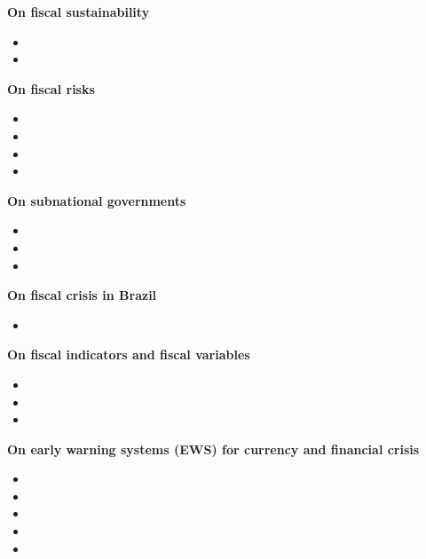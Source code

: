 \documentclass[12pt]{article}
\begin{document}
\textbf{On fiscal sustainability}

\begin{itemize}
\item {}
\item {}
\end{itemize}

\textbf{On fiscal risks}

\begin{itemize}
\item {}
\item {}
\item {}
\item {}
\end{itemize}

\textbf{On subnational governments}

\begin{itemize}
\item {}
\item {}
\item {}
\end{itemize}

\textbf{On fiscal crisis in Brazil}

\begin{itemize}
\item {}
\end{itemize}

\textbf{On fiscal indicators and fiscal variables}

\begin{itemize}
\item {}
\item {}
\item {}
\end{itemize}

\textbf{On early warning systems (EWS) for currency and financial crisis}

\begin{itemize}
\item {}
\item {}
\item {}
\item {}
\item {}
\end{itemize}
\end{document}
